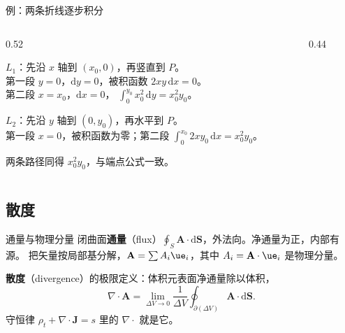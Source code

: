 \documentclass[fontset=windows, chinese, 10pt, xcolor=dvipsnames]{beamer}
\begin{document}
\begin{frame}{例：两条折线逐步积分}
  \begin{columns}[c]
    \begin{column}{0.52\textwidth}
      {\small
      $L_1$：先沿 $x$ 轴到 $(x_0,0)$，再竖直到 $P$。\\
      第一段 $y=0$，$\mathrm{d}y=0$，被积函数 $2xy\,\mathrm{d}x=0$。\\
      第二段 $x=x_0$，$\mathrm{d}x=0$，
      $\displaystyle\int_0^{y_0}x_0^2\,\mathrm{d}y=x_0^2 y_0$。
      \vspace{0.3em}

      $L_2$：先沿 $y$ 轴到 $(0,y_0)$，再水平到 $P$。\\
      第一段 $x=0$，被积函数为零；第二段
      $\displaystyle\int_0^{x_0}2x y_0\,\mathrm{d}x=x_0^2 y_0$。
      }

      \vspace{0.35em}
      两条路径同得 $x_0^2 y_0$，与端点公式一致。
    \end{column}
    \begin{column}{0.44\textwidth}
      \centering
      
    \end{column}
  \end{columns}
\end{frame}

\subsection{散度}

\begin{frame}{通量与物理分量}
  闭曲面\textbf{通量}（flux）$\oint_S\mathbf{A}\cdot\mathrm{d}\mathbf{S}$，外法向。净通量为正，内部有源。
  把矢量按局部基分解，$\mathbf{A}=\sum A_i\ue_i$，其中 $A_i=\mathbf{A}\cdot\ue_i$ 是物理分量。
  \vspace{0.3em}

  \textbf{散度}（divergence）的极限定义：体积元表面净通量除以体积，
  \begin{equation*}
    \boxed{\displaystyle
      \nabla\cdot\mathbf{A}
      =\lim_{\Delta V\to 0}
        \frac{1}{\Delta V}
        \oint_{\partial(\Delta V)}\mathbf{A}\cdot\mathrm{d}\mathbf{S}.}
  \end{equation*}
  守恒律 $\rho_t+\nabla\cdot\mathbf{J}=s$ 里的 $\nabla\cdot$ 就是它。
\end{frame}
\end{document}
